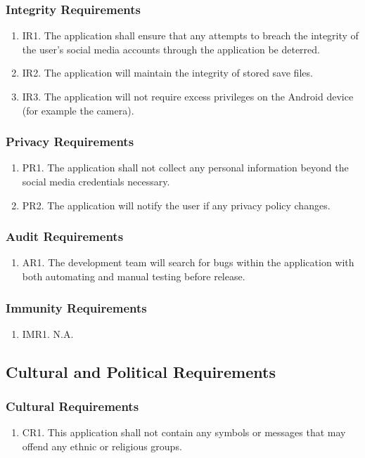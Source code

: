 \documentclass[]{article}
\begin{document}
\subsubsection{Integrity Requirements}
\begin{enumerate}
	\item IR1. The application shall ensure that any attempts to breach the integrity of the user's social media accounts through the application be deterred.
	\item IR2. The application will maintain the integrity of stored save files.
	\item IR3. The application will not require excess privileges on the Android device (for example the camera).
\end{enumerate}

\subsubsection{Privacy Requirements}
\begin{enumerate}
	\item PR1. The application shall not collect any personal information beyond the social media credentials necessary.
	\item PR2. The application will notify the user if any privacy policy changes.
\end{enumerate}

\subsubsection{Audit Requirements}
\begin{enumerate}
	\item AR1. The development team will search for bugs within the application with both automating and manual testing before release.
\end{enumerate}

\subsubsection{Immunity Requirements}
\begin{enumerate}
	\item IMR1. N.A.
\end{enumerate}

\subsection{Cultural and Political Requirements}
\subsubsection{Cultural Requirements}
\begin{enumerate}
	\item CR1. This application shall not contain any symbols or messages that may offend any ethnic or religious groups.
\end{enumerate}
\end{document}
